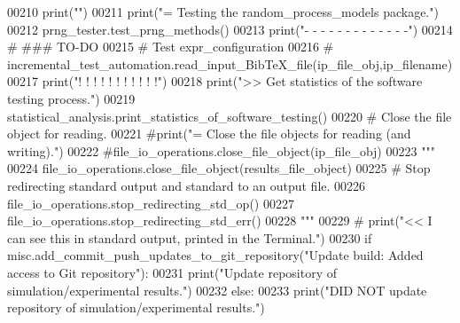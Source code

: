 \begin{DoxyCode}
00210     print(\textcolor{stringliteral}{""})
00211     print(\textcolor{stringliteral}{"=    Testing the random\_process\_models package."})
00212     prng\_tester.test\_prng\_methods()
00213     print(\textcolor{stringliteral}{"-    -   -   -   -   -   -   -   -   -   -   -   -"})
00214     \textcolor{comment}{#   ### TO-DO}
00215     \textcolor{comment}{#   Test expr\_configuration}
00216 \textcolor{comment}{#   incremental\_test\_automation.read\_input\_BibTeX\_file(ip\_file\_obj,ip\_filename)}
00217     print(\textcolor{stringliteral}{"!    !   !   !   !   !   !   !   !   !   !"})
00218     print(\textcolor{stringliteral}{">>   Get statistics of the software testing process."})
00219     statistical\_analysis.print\_statistics\_of\_software\_testing()
00220     \textcolor{comment}{# Close the file object for reading.}
00221     \textcolor{comment}{#print("=   Close the file objects for reading (and writing).")}
00222     \textcolor{comment}{#file\_io\_operations.close\_file\_object(ip\_file\_obj)}
00223     \textcolor{stringliteral}{"""}
00224 \textcolor{stringliteral}{    file\_io\_operations.close\_file\_object(results\_file\_object)}
00225 \textcolor{stringliteral}{    # Stop redirecting standard output and standard to an output file.}
00226 \textcolor{stringliteral}{    file\_io\_operations.stop\_redirecting\_std\_op()}
00227 \textcolor{stringliteral}{    file\_io\_operations.stop\_redirecting\_std\_err()}
00228 \textcolor{stringliteral}{    """}
00229 \textcolor{comment}{#   print("<<   I can see this in standard output, printed in the Terminal.")}
00230     \textcolor{keywordflow}{if} misc.add\_commit\_push\_updates\_to\_git\_repository(\textcolor{stringliteral}{"Update build: Added access to Git repository"}):
00231         print(\textcolor{stringliteral}{"Update repository of simulation/experimental results."})
00232     \textcolor{keywordflow}{else}:
00233         print(\textcolor{stringliteral}{"DID NOT update repository of simulation/experimental results."})
\end{DoxyCode}
